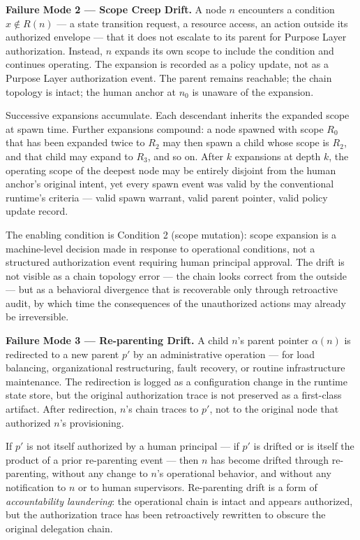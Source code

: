 \medskip
\noindent\textbf{Failure Mode 2 — Scope Creep Drift.}
A node $n$ encounters a condition $x \notin R(n)$ — a state transition request, a resource access, an action outside its authorized envelope — that it does not escalate to its parent for Purpose Layer authorization. Instead, $n$ expands its own scope to include the condition and continues operating. The expansion is recorded as a policy update, not as a Purpose Layer authorization event. The parent remains reachable; the chain topology is intact; the human anchor at $n_0$ is unaware of the expansion.

Successive expansions accumulate. Each descendant inherits the expanded scope at spawn time. Further expansions compound: a node spawned with scope $R_0$ that has been expanded twice to $R_2$ may then spawn a child whose scope is $R_2$, and that child may expand to $R_3$, and so on. After $k$ expansions at depth $k$, the operating scope of the deepest node may be entirely disjoint from the human anchor's original intent, yet every spawn event was valid by the conventional runtime's criteria — valid spawn warrant, valid parent pointer, valid policy update record.

The enabling condition is Condition 2 (scope mutation): scope expansion is a machine-level decision made in response to operational conditions, not a structured authorization event requiring human principal approval. The drift is not visible as a chain topology error — the chain looks correct from the outside — but as a behavioral divergence that is recoverable only through retroactive audit, by which time the consequences of the unauthorized actions may already be irreversible.

\medskip
\noindent\textbf{Failure Mode 3 — Re-parenting Drift.}
A child $n$'s parent pointer $\alpha(n)$ is redirected to a new parent $p'$ by an administrative operation — for load balancing, organizational restructuring, fault recovery, or routine infrastructure maintenance. The redirection is logged as a configuration change in the runtime state store, but the original authorization trace is not preserved as a first-class artifact. After redirection, $n$'s chain traces to $p'$, not to the original node that authorized $n$'s provisioning.

If $p'$ is not itself authorized by a human principal — if $p'$ is drifted or is itself the product of a prior re-parenting event — then $n$ has become drifted through re-parenting, without any change to $n$'s operational behavior, and without any notification to $n$ or to human supervisors. Re-parenting drift is a form of \emph{accountability laundering}: the operational chain is intact and appears authorized, but the authorization trace has been retroactively rewritten to obscure the original delegation chain.

